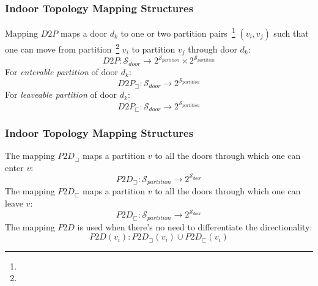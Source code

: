 
\begin{frame}
\frametitle{Indoor Topology Mapping Structures}

Mapping $D2P$ maps a door $d_k$ to one or two partition pairs~\footnote{} $(v_i, v_j)$ such that one can move from partition~\footnote{} $v_i$ to partition $v_j$ through door $d_k$:
\pause
\begin{equation}
 D2P: \mathcal{S}_{door} \rightarrow 2^{\mathcal{S}_{partition}} \times 2^{\mathcal{S}_{partition}}
\end{equation}
\pause
For \emph{enterable partition} of door $d_k$:
\pause
\begin{equation}
 D2P_{\sqsupset}: \mathcal{S}_{door} \rightarrow 2^{\mathcal{S}_{partition}}
\end{equation}
\pause
For \emph{leaveable partition} of door $d_k$:
\pause
\begin{equation}
 D2P_{\sqsubset}: \mathcal{S}_{door} \rightarrow 2^{\mathcal{S}_{partition}}
\end{equation}
\end{frame}


\begin{frame}
\frametitle{Indoor Topology Mapping Structures}


The mapping $P2D_{\sqsupset}$ maps a partition $v$ to all the doors through which one can enter $v$:
\pause
\begin{equation}
 P2D_{\sqsupset}: \mathcal{S}_{partition} \rightarrow 2^{\mathcal{S}_{door}}
\end{equation}
\pause
The mapping $P2D_{\sqsubset}$ maps a partition $v$ to all the doors through which one can leave $v$:
\pause
\begin{equation}
 P2D_{\sqsubset}: \mathcal{S}_{partition} \rightarrow 2^{\mathcal{S}_{door}}
\end{equation}
\pause
The mapping $P2D$ is used when there's no need to differentiate the directionality:
\pause
\begin{equation}
 P2D(v_i): P2D_{\sqsupset}(v_i) \cup P2D_{\sqsubset}(v_i)
\end{equation}
\end{frame}

